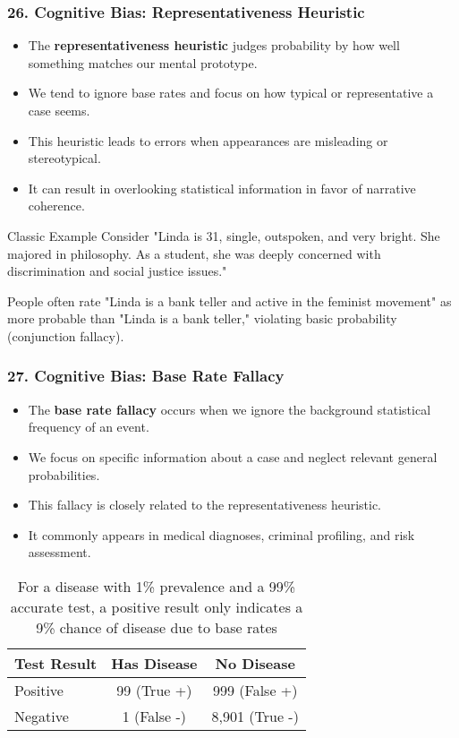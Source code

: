 \documentclass{beamer}
\begin{document}
\begin{frame}
\frametitle{26. Cognitive Bias: Representativeness Heuristic}
\begin{itemize}
\item The \textbf{representativeness heuristic} judges probability by how well something matches our mental prototype.
\item We tend to ignore base rates and focus on how typical or representative a case seems.
\item This heuristic leads to errors when appearances are misleading or stereotypical.
\item It can result in overlooking statistical information in favor of narrative coherence.
\end{itemize}

\begin{alertblock}{Classic Example}
Consider "Linda is 31, single, outspoken, and very bright. She majored in philosophy. As a student, she was deeply concerned with discrimination and social justice issues."

People often rate "Linda is a bank teller and active in the feminist movement" as more probable than "Linda is a bank teller," violating basic probability (conjunction fallacy).
\end{alertblock}
\end{frame}

\begin{frame}
\frametitle{27. Cognitive Bias: Base Rate Fallacy}
\begin{itemize}
\item The \textbf{base rate fallacy} occurs when we ignore the background statistical frequency of an event.
\item We focus on specific information about a case and neglect relevant general probabilities.
\item This fallacy is closely related to the representativeness heuristic.
\item It commonly appears in medical diagnoses, criminal profiling, and risk assessment.
\end{itemize}

\begin{table}
\centering
\begin{tabular}{|l|c|c|}
\hline
\textbf{Test Result} & \textbf{Has Disease} & \textbf{No Disease} \\
\hline
Positive & 99 (True +) & 999 (False +) \\
\hline
Negative & 1 (False -) & 8,901 (True -) \\
\hline
\end{tabular}
\caption{For a disease with 1\% prevalence and a 99\% accurate test, a positive result only indicates a 9\% chance of disease due to base rates}
\end{table}
\end{frame}
\end{document}
